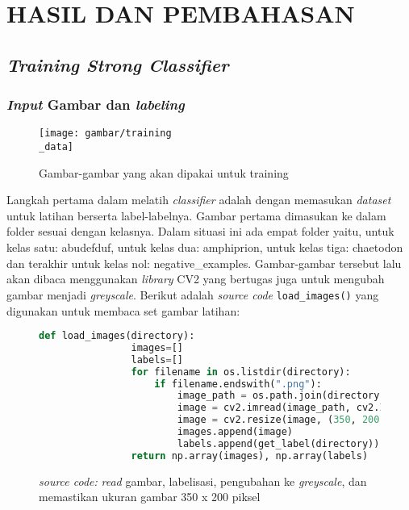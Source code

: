 
\chapter{HASIL DAN PEMBAHASAN}

\section{\textit{Training Strong Classifier}}
\subsection{\textit{Input} Gambar dan \textit{labeling}}

	\begin{figure}[H]
		\centering{}
		\texttt{[image: gambar/training\\\_data]}
		\caption{Gambar-gambar yang akan dipakai untuk training}
	\end{figure}

	Langkah pertama dalam melatih \textit{classifier} adalah dengan memasukan 
	\textit{dataset} untuk latihan berserta label-labelnya. Gambar pertama dimasukan 
	ke dalam folder sesuai dengan kelasnya. Dalam situasi ini ada empat folder yaitu, 
	untuk kelas satu: abudefduf, untuk kelas dua: amphiprion, untuk kelas tiga: chaetodon 
	dan terakhir untuk kelas nol: negative\_examples. Gambar-gambar tersebut lalu akan dibaca 
	menggunakan \textit{library} CV2 yang bertugas juga untuk mengubah gambar menjadi 
	\textit{greyscale}. Berikut adalah \emph{source code} \texttt{load\_images()}
	yang digunakan untuk membaca set gambar latihan:

	\begin{figure}[H]
		\begin{lstlisting}[language=Python, basicstyle=\tiny]
			def load_images(directory):
				images=[]
				labels=[]
				for filename in os.listdir(directory):
					if filename.endswith(".png"):
						image_path = os.path.join(directory, filename)
						image = cv2.imread(image_path, cv2.IMREAD_GRAYSCALE)
						image = cv2.resize(image, (350, 200))
						images.append(image)
						labels.append(get_label(directory))
				return np.array(images), np.array(labels)
		\end{lstlisting}
		\caption{\emph{source code:} \textit{read} gambar, labelisasi, pengubahan ke \textit{greyscale}, 
		dan memastikan ukuran gambar 350 x 200 piksel}
		\label{code:pre-processing gambar}
	\end{figure}


